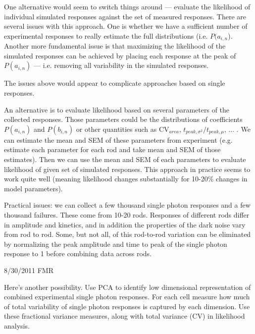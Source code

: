 \documentclass[12pt]{article}
\begin{document}
One alternative would seem to switch things around --- evaluate the likelihood of individual simulated responses against the set of measured responses.  There are several issues with this approach.  One is whether we have a sufficient number of experimental responses to really estimate the full distributions (i.e. $P(a_{i,n}$).  Another more fundamental issue is that maximizing the likelihood of the simulated responses can be achieved by placing each response at the peak of $P(a_{i,n})$ --- i.e. removing all variability in the simulated responses.  

The issues above would appear to complicate approaches based on single responses. 

An alternative is to evaluate likelihood based on several parameters of the collected responses.  Those parameters could be the distributions of coefficients $P(a_{i,n})$ and $P(b_{i,n})$ or other quantities such as CV$_{area}$, $t_{peak, \sigma^2} / t_{peak, \mu}$, ... .  We can estimate the mean and SEM of these parameters from experiment (e.g. estimate each parameter for each rod and take mean and SEM of those estimates).  Then we can use the mean and SEM of each parameters to evaluate likelihood of given set of simulated responses.  This approach in practice seems to work quite well (meaning likelihood changes substantially for 10-20\% changes in model parameters).  

Practical issues: we can collect a few thousand single photon responses and a few thousand failures.  These come from 10-20 rods.  Responses of different rods differ in amplitude and kinetics, and in addition the properties of the dark noise vary from rod to rod.  Some, but not all, of this rod-to-rod variation can be eliminated by normalizing the peak amplitude and time to peak of the single photon response to 1 before combining data across rods.  

8/30/2011 FMR

Here's another possibility.  Use PCA to identify low dimensional representation of combined experimental single photon responses.  For each cell measure how much of total variability of single photon responses is captured by each dimension.  Use these fractional variance measures, along with total variance (CV) in likelihood analysis.  
\end{document}
